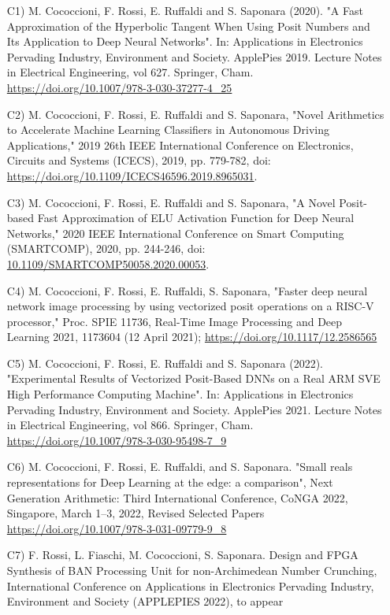 \begin{enumerate} 
    \item [C1)] M. Cococcioni, F. Rossi, E. Ruffaldi and S. Saponara (2020). "A Fast Approximation of the Hyperbolic Tangent When Using Posit Numbers and Its Application to Deep Neural Networks". In: Applications in Electronics Pervading Industry, Environment and Society. ApplePies 2019. Lecture Notes in Electrical Engineering, vol 627. Springer, Cham. \url{https://doi.org/10.1007/978-3-030-37277-4_25}
    \item [C2)] M. Cococcioni, F. Rossi, E. Ruffaldi and S. Saponara, "Novel Arithmetics to Accelerate Machine Learning Classifiers in Autonomous Driving Applications," 2019 26th IEEE International Conference on Electronics, Circuits and Systems (ICECS), 2019, pp. 779-782, doi: \url{https://doi.org/10.1109/ICECS46596.2019.8965031}.
    \item [C3)] M. Cococcioni, F. Rossi, E. Ruffaldi and S. Saponara, "A Novel Posit-based Fast Approximation of ELU Activation Function for Deep Neural Networks," 2020 IEEE International Conference on Smart Computing (SMARTCOMP), 2020, pp. 244-246, doi: \url{10.1109/SMARTCOMP50058.2020.00053}.
    \item [C4)] M. Cococcioni, F. Rossi, E. Ruffaldi, S. Saponara, "Faster deep neural network image processing by using vectorized posit operations on a RISC-V processor," Proc. SPIE 11736, Real-Time Image Processing and Deep Learning 2021, 1173604 (12 April 2021); \url{https://doi.org/10.1117/12.2586565}
    \item [C5)] M. Cococcioni, F. Rossi, E. Ruffaldi and S. Saponara (2022). "Experimental Results of Vectorized Posit-Based DNNs on a Real ARM SVE High Performance Computing Machine". In: Applications in Electronics Pervading Industry, Environment and Society. ApplePies 2021. Lecture Notes in Electrical Engineering, vol 866. Springer, Cham. \url{https://doi.org/10.1007/978-3-030-95498-7_9}
    \item[C6)] M. Cococcioni,  F. Rossi,  E. Ruffaldi,  and S. Saponara. "Small reals representations for Deep Learning at the edge: a comparison", Next Generation Arithmetic: Third International Conference, CoNGA 2022, Singapore, March 1–3, 2022, Revised Selected Papers \url{https://doi.org/10.1007/978-3-031-09779-9_8}
    \item[C7)] F. Rossi, L. Fiaschi, M. Cococcioni, S. Saponara. Design and FPGA Synthesis of BAN Processing Unit for non-Archimedean Number Crunching, International Conference on Applications in Electronics Pervading Industry, Environment and Society (APPLEPIES 2022), to appear
\end{enumerate}


